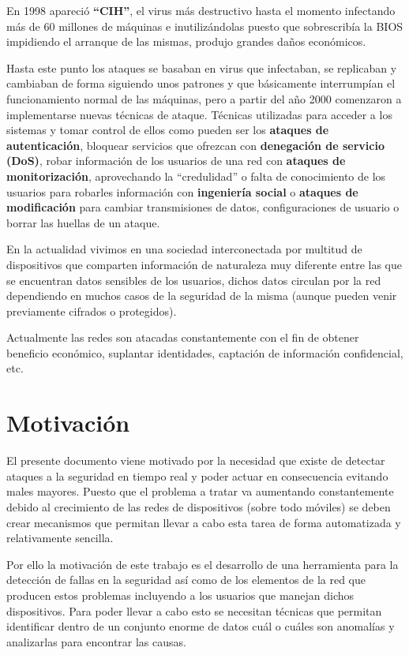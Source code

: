 \cite{CIH} En 1998 apareció \textbf{“CIH”}, el virus  más destructivo hasta el momento infectando más de 60 millones de máquinas e inutilizándolas puesto que sobrescribía la BIOS impidiendo el arranque de las mismas, produjo grandes daños económicos.
\bigskip

Hasta este punto los ataques se basaban en virus  que infectaban, se replicaban y cambiaban de forma siguiendo unos patrones y que básicamente interrumpían el funcionamiento normal de las máquinas, pero a partir del año 2000 comenzaron a implementarse nuevas técnicas de ataque. Técnicas utilizadas para acceder a los sistemas y tomar control de ellos como pueden ser los \textbf{ataques de autenticación}, bloquear servicios que ofrezcan con \textbf{denegación de servicio (DoS)}, robar información de los usuarios de una red con \textbf{ataques de monitorización}, aprovechando la “credulidad” o falta de conocimiento de los usuarios para robarles información con \textbf{ingeniería social}  o \textbf{ataques de modificación}  para cambiar transmisiones de datos, configuraciones de usuario o borrar las huellas de un ataque.
\bigskip

En la actualidad vivimos en una sociedad interconectada por multitud de dispositivos que comparten información de naturaleza muy diferente entre las que se encuentran datos sensibles de los usuarios, dichos datos circulan por la red dependiendo en muchos casos de la seguridad de la misma (aunque pueden venir previamente cifrados o protegidos).
\bigskip

Actualmente las redes son atacadas constantemente con el fin de obtener beneficio económico, suplantar identidades, captación de información confidencial, etc. 

\bigskip 

\section{Motivación}

El presente documento viene motivado por la necesidad que existe de detectar ataques a la seguridad en tiempo real y poder actuar en consecuencia evitando males mayores. Puesto que el problema a tratar va aumentando constantemente debido al crecimiento de las redes de dispositivos (sobre todo móviles) se deben crear mecanismos que permitan llevar a cabo esta tarea de forma automatizada y relativamente sencilla.
\bigskip

Por ello la motivación de este trabajo es el desarrollo de una herramienta para la detección de fallas en la seguridad así como de los elementos de la red que producen estos problemas incluyendo a los usuarios que manejan dichos dispositivos. Para poder llevar a cabo esto se necesitan técnicas que permitan identificar dentro de un conjunto enorme de datos cuál o cuáles son anomalías y analizarlas para encontrar las causas.

